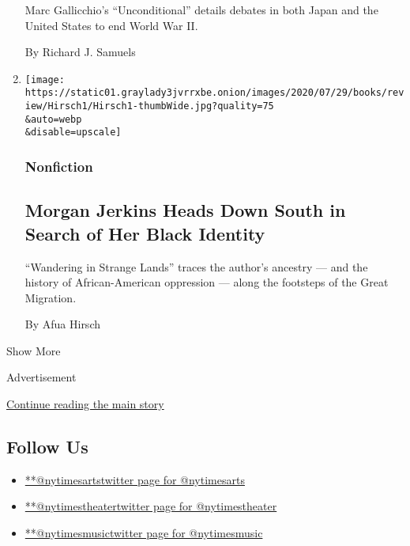 \begin{enumerate}
  Marc Gallicchio's ``Unconditional'' details debates in both Japan and
  the United States to end World War II.

  By Richard J. Samuels
\item
  \href{/2020/08/03/books/review/wandering-in-strange-lands-morgan-jerkins.html}{}

  \texttt{[image: https://static01.graylady3jvrrxbe.onion/images/2020/07/29/books/review/Hirsch1/Hirsch1-thumbWide.jpg?quality=75\\\&auto=webp\\\&disable=upscale]}

  \hypertarget{nonfiction-1}{%
  \subsubsection{Nonfiction}\label{nonfiction-1}}

  \hypertarget{morgan-jerkins-heads-down-south-in-search-of-her-black-identity}{%
  \subsection{Morgan Jerkins Heads Down South in Search of Her Black
  Identity}\label{morgan-jerkins-heads-down-south-in-search-of-her-black-identity}}

  ``Wandering in Strange Lands'' traces the author's ancestry --- and
  the history of African-American oppression --- along the footsteps of
  the Great Migration.

  By Afua Hirsch
\end{enumerate}

Show More

Advertisement

\protect\hyperlink{after-mid2}{Continue reading the main story}

\hypertarget{follow-us}{%
\subsection{Follow Us}\label{follow-us}}

\begin{itemize}
\tightlist
\item
  \href{https://twitter.com/nytimesarts}{**@nytimesartstwitter page for
  @nytimesarts}
\item
  \href{https://twitter.com/nytimestheater}{**@nytimestheatertwitter
  page for @nytimestheater}
\item
  \href{https://twitter.com/nytimesmusic}{**@nytimesmusictwitter page
  for @nytimesmusic}
\end{itemize}

